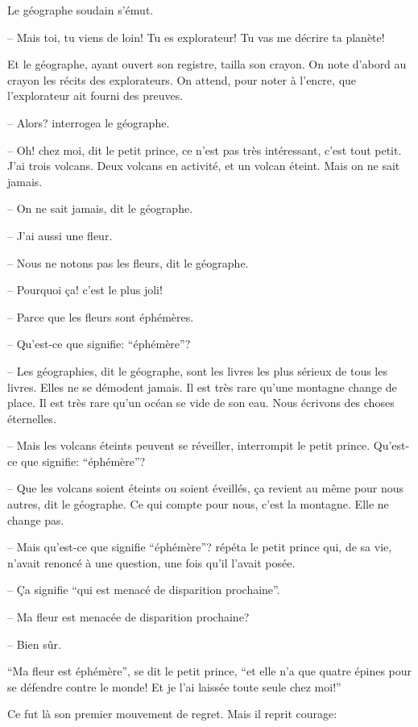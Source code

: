 \begin{Parallel}[p]{}{}
{Le géographe soudain s'émut.

-- Mais toi, tu viens de loin! Tu es explorateur! Tu
vas me décrire ta planète!

Et le géographe, ayant ouvert son registre, tailla
son crayon. On note d'abord au crayon les récits des
explorateurs. On attend, pour noter à l'encre, que
l'explorateur ait fourni des preuves.

-- Alors? interrogea le géographe.

-- Oh! chez moi, dit le petit prince, ce n'est pas
très intéressant, c'est tout petit. J'ai trois volcans.
Deux volcans en activité, et un volcan éteint. Mais
on ne sait jamais.

-- On ne sait jamais, dit le géographe.

-- J'ai aussi une fleur.

-- Nous ne notons pas les fleurs, dit le géographe.

-- Pourquoi ça! c'est le plus joli!

-- Parce que les fleurs sont éphémères.

-- Qu'est-ce que signifie: ``éphémère''?

-- Les géographies, dit le géographe, sont les
livres les plus sérieux de tous les livres. Elles ne se
démodent jamais. Il est très rare qu'une montagne
change de place. Il est très rare qu'un océan se vide
de son eau. Nous écrivons des choses éternelles.

-- Mais les volcans éteints peuvent se réveiller,
interrompit le petit prince. Qu'est-ce que signifie:
``éphémère''?

-- Que les volcans soient éteints ou soient
éveillés, ça revient au même pour nous autres, dit le
géographe. Ce qui compte pour nous, c'est la montagne. Elle ne change pas.

-- Mais qu'est-ce que signifie ``éphémère''? répéta le petit prince qui, de sa vie, n'avait renoncé à
une question, une fois qu'il l'avait posée.

-- Ça signifie ``qui est menacé de disparition prochaine''.

-- Ma fleur est menacée de disparition prochaine?

-- Bien sûr.

``Ma fleur est éphémère'', se dit le petit prince, ``et elle n'a que quatre épines pour se défendre contre
le monde! Et je l'ai laissée toute seule chez moi!''

Ce fut là son premier mouvement de regret. Mais
il reprit courage:

}
\end{Parallel}
